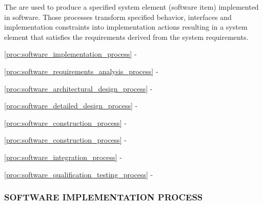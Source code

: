 		\begin{adjustwidth}{1em}{0pt}

			The  are used to produce a specified system element (software item) implemented in software. Those processes transform specified behavior, interfaces and implementation constraints into implementation actions resulting in a system element that satisfies the requirements derived from the system requirements.

			\begin{compactitem}
				
				\item \ref{proc:software_implementation_process} - 

				\item \ref{proc:software_requirements_analysis_process} - 

				\item \ref{proc:software_architectural_design_process} - 

				\item \ref{proc:software_detailed_design_process} - 

				\item \ref{proc:software_construction_process} - 

				\item \ref{proc:software_construction_process} - 

				\item \ref{proc:software_integration_process} - 

				\item \ref{proc:software_qualification_testing_process} - 

			\end{compactitem}

		\end{adjustwidth}

		\newpage
		\subsubsection{SOFTWARE IMPLEMENTATION PROCESS\label{proc:software_implementation_process}}

